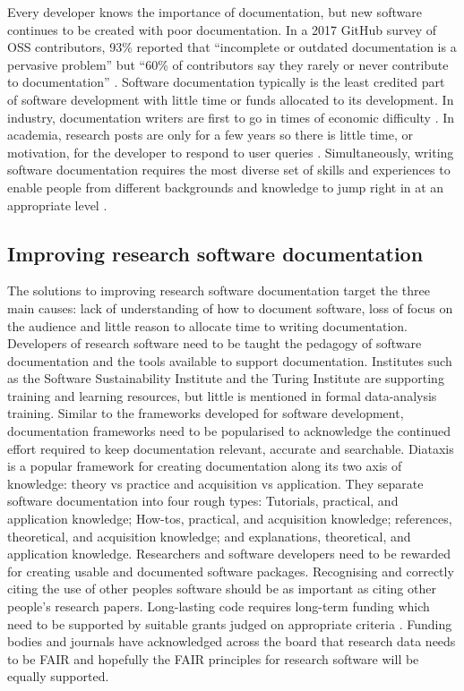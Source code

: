 \documentclass[../main.tex]{subfiles}
\begin{document}
Every developer knows the importance of documentation, but new software continues to be created with poor documentation.
In a 2017 GitHub survey of OSS contributors, 93\% reported that “incomplete or outdated documentation is a pervasive problem” but “60\% of contributors say they rarely or never contribute to documentation” \parencite{Geiger2017}.
Software documentation typically is the least credited part of software development with little time or funds allocated to its development.
In industry, documentation writers are first to go in times of economic difficulty \parencite{Forward2002}.
In academia, research posts are only for a few years so there is little time, or motivation, for the developer to respond to user queries \parencite{Hermann2022}.
Simultaneously, writing software documentation requires the most diverse set of skills and experiences to enable people from different backgrounds and knowledge to jump right in at an appropriate level \parencite{Geiger2018}.


\subsection{Improving research software documentation}

The solutions to improving research software documentation target the three main causes: lack of understanding of how to document software, loss of focus on the audience and little reason to allocate time to writing documentation. 
Developers of research software need to be taught the pedagogy of software documentation and the tools available to support documentation.
Institutes such as the Software Sustainability Institute and the Turing Institute are supporting training and learning resources, but little is mentioned in formal data-analysis training. 
Similar to the frameworks developed for software development, documentation frameworks need to be popularised to acknowledge the continued effort required to keep documentation relevant, accurate and searchable.
Diataxis is a popular framework for creating documentation along its two axis of knowledge: theory vs practice and acquisition vs application. 
They separate software documentation into four rough types: Tutorials, practical, and application knowledge; How-tos, practical, and acquisition knowledge; references, theoretical, and acquisition knowledge; and explanations, theoretical, and application knowledge.
Researchers and software developers need to be rewarded for creating usable and documented software packages.
Recognising and correctly citing the use of other peoples software should be as important as citing other people's research papers.
Long-lasting code requires long-term funding which need to be supported by suitable grants judged on appropriate criteria \parencite{Goble2014}.
Funding bodies and journals have acknowledged across the board that research data needs to be FAIR and hopefully the FAIR principles for research software will be equally supported.
\end{document}
